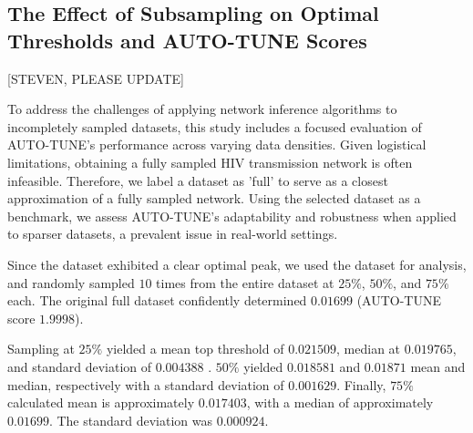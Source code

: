 \documentclass[utf8]{FrontiersinHarvard} %
\begin{document}

\subsection{The Effect of Subsampling on Optimal Thresholds and AUTO-TUNE Scores}
[STEVEN, PLEASE UPDATE]

To address the challenges of applying network inference algorithms to
incompletely sampled datasets, this study includes a focused evaluation of
AUTO-TUNE's performance across varying data densities. Given logistical
limitations, obtaining a fully sampled HIV transmission network is often
infeasible. Therefore, we label a dataset as 'full' to serve as a closest
approximation of a fully sampled network. Using the selected dataset as a
benchmark, we assess AUTO-TUNE's adaptability and robustness when applied to
sparser datasets, a prevalent issue in real-world settings.

Since the \citep{rhee_national_2019} dataset exhibited a clear optimal peak, we
used the dataset for analysis, and randomly sampled $10$ times from the entire
dataset at $25\%$, $50\%$, and $75\%$ each. The original full dataset
confidently determined $0.01699$ (AUTO-TUNE score $1.9998$).

Sampling at $25\%$ yielded a mean top threshold of $0.021509$, median at
$0.019765$, and standard deviation of $0.004388$ \label{fig:subsampling}.
$50\%$ yielded $0.018581$ and $0.01871$ mean and median, respectively with a
standard deviation of $0.001629$. Finally, $75\%$ calculated mean is
approximately $0.017403$, with a median of approximately $0.01699$. The
standard deviation was $0.000924$.
\end{document}
